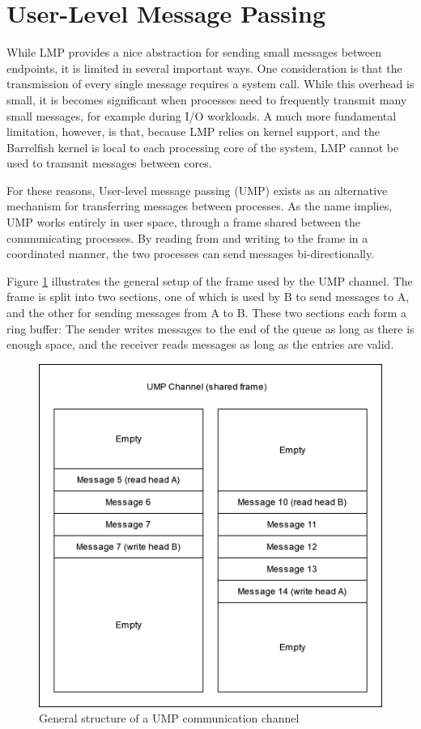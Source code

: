 \section{User-Level Message Passing}
While LMP provides a nice abstraction for sending small messages between endpoints, it is limited in several important ways. One consideration is that the transmission of every single message requires a system call. While this overhead is small, it is becomes significant when processes need to frequently transmit many small messages, for example during I/O workloads.
A much more fundamental limitation, however, is that, because LMP relies on kernel support, and the Barrelfish kernel is local to each processing core of the system, LMP cannot be used to transmit messages between cores.

For these reasons, User-level message passing (UMP) exists as an alternative mechanism for transferring messages between processes. As the name implies, UMP works entirely in user space, through a frame shared between the communicating processes. By reading from and writing to the frame in a coordinated manner, the two processes can send messages bi-directionally.

Figure \ref{fig:rpc:umpchan} illustrates the general setup of the frame used by the UMP channel. The frame is split into two sections, one of which is used by B to send messages to A, and the other for sending messages from A to B. These two sections each form a ring buffer: The sender writes messages to the end of the queue as long as there is enough space, and the receiver reads messages as long as the entries are valid.
\begin{figure}[htp]
    \centering
    \includegraphics[width=12cm]{images/rpc/ump_chan.png}
    \caption{General structure of a UMP communication channel}
    \label{fig:rpc:umpchan}
\end{figure}

